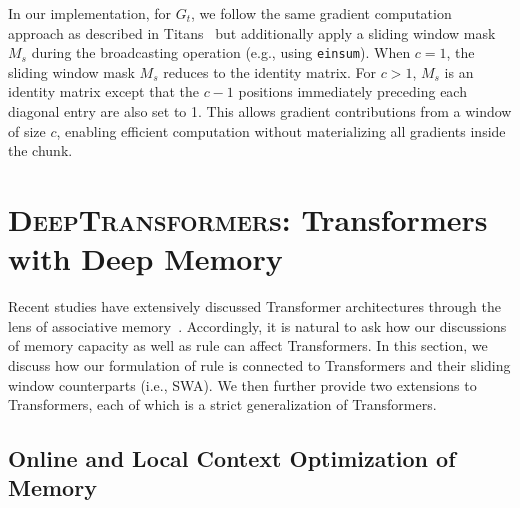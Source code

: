 In our implementation, for $G_t$, we follow the same gradient computation approach as described in Titans~\citep{behrouz2024titans} but additionally apply a sliding window mask \( M_s \) during the broadcasting operation (e.g., using \texttt{einsum}). When \( c = 1 \), the sliding window mask \( M_s \) reduces to the identity matrix. For \( c > 1 \), \( M_s \) is an identity matrix except that the \( c - 1 \) positions immediately preceding each diagonal entry are also set to 1. This allows gradient contributions from a window of size \( c \), enabling efficient computation without materializing all gradients inside the chunk.




\section{\protect \textsc{DeepTransformer}s: Transformers with Deep Memory}\label{sec:deeptransformers}
Recent studies have extensively discussed Transformer architectures through the lens of associative memory~\citep{wang2025test, sun2024learning, behrouz2025Miras}. Accordingly, it is natural to ask how our discussions of memory capacity as well as \learningrule{} rule can affect Transformers. In this section, we discuss how our formulation of \learningrule{} rule is connected to Transformers and their sliding window counterparts (i.e., SWA). We then further provide two extensions to Transformers, each of which is a strict generalization of Transformers.  


\subsection{Online and Local Context Optimization of Memory}

